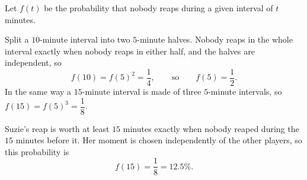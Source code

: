 Let $f(t)$ be the probability that nobody reaps during a given interval of $t$ minutes.

Split a $10$-minute interval into two $5$-minute halves. Nobody reaps in the whole interval exactly when nobody reaps in either half, and the halves are independent, so
\[f(10)=f(5)^2=\dfrac14,\qquad\text{so}\qquad f(5)=\dfrac12.\]
In the same way a $15$-minute interval is made of three $5$-minute intervals, so $f(15)=f(5)^3=\dfrac18$.

Suzie's reap is worth at least $15$ minutes exactly when nobody reaped during the $15$ minutes before it. Her moment is chosen independently of the other players, so this probability is
\[f(15)=\boxed{\dfrac18}=12.5\%.\]
